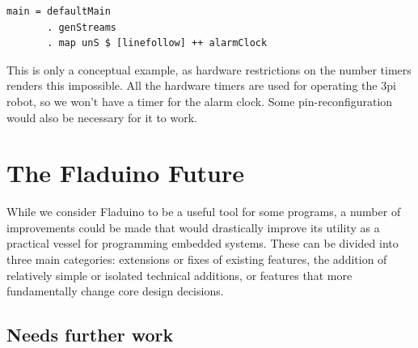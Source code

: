 \documentclass[a4paper, oneside, final]{memoir}
\begin{document}
\begin{verbatim}
main = defaultMain
       . genStreams
       . map unS $ [linefollow] ++ alarmClock
\end{verbatim}

This is only a conceptual example, as hardware restrictions on the
number timers renders this impossible. All the hardware timers are used
for operating the 3pi robot, so we won't have a timer for the alarm
clock. Some pin-reconfiguration would also be necessary for it to
work.


\chapter{The Fladuino Future}
\label{chap:futurework}

While we consider Fladuino to be a useful tool for some programs, a
number of improvements could be made that would drastically improve
its utility as a practical vessel for programming embedded systems.
These can be divided into three main categories: extensions or fixes
of existing features, the addition of relatively simple or isolated
technical additions, or features that more fundamentally change core
design decisions.



\section{Needs further work}
\end{document}
